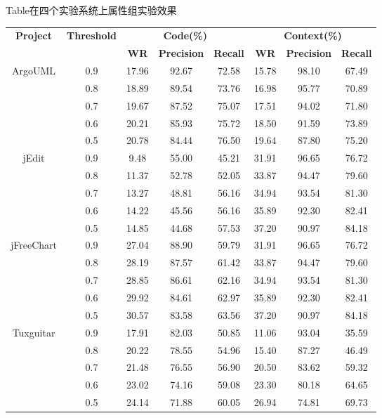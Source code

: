 \begin{table}[htbp]
{Table$\!$}{在四个实验系统上属性组实验效果}
\vspace{0.5em}\centering\wuhao
\begin{tabular}{cccccccc}
\toprule[1.5pt]
\multirow{2}{*}{\textbf{Project}}&\multirow{2}{*}{\textbf{Threshold}}&\multicolumn{3}{c}{\textbf{ Code(\%)}}&\multicolumn{3}{c}{\textbf{ Context(\%)}}\\
&&\textbf{WR}&\textbf{Precision}&\textbf{Recall}&\textbf{WR}&\textbf{Precision}&\textbf{Recall}\\
\midrule[1pt]
\multirow{5}{*}{ArgoUML}
&0.9&	17.96&	92.67&	72.58&	15.78&	98.10&	67.49\\
&0.8&	18.89&	89.54&	73.76&	16.98&	95.77&	70.89\\
&0.7&	19.67&	87.52&	75.07&	17.51&	94.02&	71.80\\
&0.6&	20.21&	85.93&	75.72&	18.50&	91.59&	73.89\\
&0.5&	20.78&	84.44&	76.50&	19.64&	87.80&	75.20\\

\multirow{5}{*}{jEdit}
&0.9&	9.48&	55.00&	45.21&	31.91&	96.65&	76.72\\
&0.8&	11.37&	52.78&	52.05&	33.87&	94.47&	79.60\\
&0.7&	13.27&	48.81&	56.16&	34.94&	93.54&	81.30\\
&0.6&	14.22&	45.56&	56.16&	35.89&	92.30&	82.41\\
&0.5&	14.85&	44.68&	57.53&	37.20&	90.97&	84.18\\

\multirow{5}{*}{jFreeChart}
&0.9&	27.04&	88.90&	59.79&	31.91&	96.65&	76.72\\
&0.8&	28.19&	87.57&	61.42&	33.87&	94.47&	79.60\\
&0.7&	28.85&	86.61&	62.16&	34.94&	93.54&	81.30\\
&0.6&	29.92&	84.61&	62.97&	35.89&	92.30&	82.41\\
&0.5&	30.57&	83.58&	63.56&	37.20&	90.97&	84.18\\

\multirow{5}{*}{Tuxguitar}
&0.9&	17.91&	82.03&	50.85&	11.06&	93.04&	35.59\\
&0.8&	20.22&	78.55&	54.96&	15.40&	87.27&	46.49\\
&0.7&	21.48&	76.55&	56.90&	20.50&	83.62&	59.32\\
&0.6&	23.02&	74.16&	59.08&	23.30&	80.18&	64.65\\
&0.5&	24.14&	71.88&	60.05&	26.94&	74.81&	69.73\\

\bottomrule[1.5pt]
\end{tabular}
\end{table}

